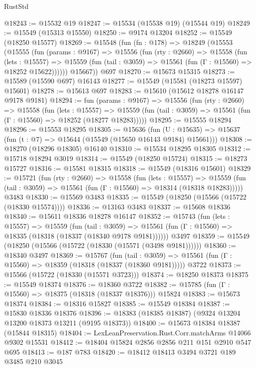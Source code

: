 \begin{lexlean}{RustStd}
\begin{coremodule}
@18243 := @15532 @19
@18247 := @15534 (@15538 @19) (@15544 @19)
@18249 := @15549 (@15313 @15550)
@18250 := @9174 @13204
@18252 := @15549 (@18250 @15577)
@18269 := @15548
    (fun (fn : @178) =>
    @18249
      (@15553
        (@15555
          (fun (params : @9167) =>
          @15556
            (fun (rty : @2660) =>
            @15558
              (fun (lets : @15557) =>
              @15559 (fun (tail : @3059) => @15561 (fun (Γ : @15560) => @18252 @15622))))))
        @15667))
    @697
@18270 := @15673 @15315
@18273 := @15589 (@15590 @697) @16143
@18277 := @15549 (@15581 (@18273 @15597) @15601)
@18278 := @15613 @697
@18283 := @15610 (@15612 @18278 @16147 @9178 @9181)
@18294 := fun (params : @9167) =>
  @15556
    (fun (rty : @2660) =>
    @15558
      (fun (lets : @15557) =>
      @15559 (fun (tail : @3059) => @15561 (fun (Γ : @15560) => @18252 (@18277 @18283)))))
@18295 := @15555 @18294
@18296 := @15553 @18295
@18305 := @15636
    (fun (U : @15635) => @15637 (fun (t : @7) => @15644 (@15549 (@15650 @16143 @9184) @15661)))
@18308 := @18270 (@18296 @18305) @16140
@18310 := @15534 @18295 @18305
@18312 := @15718 @18294 @3019
@18314 := @15549 (@18250 @15724)
@18315 := @18273 @15727
@18316 := @15581 @18315
@18318 := @15549 (@18316 @15601)
@18329 := @15721
    (fun (rty : @2660) =>
    @15558
      (fun (lets : @15557) =>
      @15559 (fun (tail : @3059) => @15561 (fun (Γ : @15560) => @18314 (@18318 @18283)))))
    @3483
@18330 := @15569 @3483
@18335 := @15549 (@18250 (@15566 (@15722 (@18330 @15574))))
@18336 := @13163 @3483
@18337 := @15608 @18336
@18340 := @15611 @18336 @18278 @16147
@18352 := @15743
    (fun (lets : @15557) =>
    @15559
      (fun (tail : @3059) =>
      @15561 (fun (Γ : @15560) => @18335 (@18318 (@18337 (@18340 @9178 @9181))))))
    @3497
@18359 := @15549 (@18250 (@15566 (@15722 (@18330 (@15571 (@3498 @9181))))))
@18360 := @18340 @3497
@18369 := @15767
    (fun (tail : @3059) => @15561 (fun (Γ : @15560) => @18359 (@18318 (@18337 (@18360 @9181)))))
    @3722
@18373 := @15566 (@15722 (@18330 (@15571 @3723)))
@18374 := @18250 @18373
@18375 := @15549 @18374
@18376 := @18360 @3722
@18382 := @15785 (fun (Γ : @15560) => @18375 (@18318 (@18337 @18376))) @15824
@18383 := @15673 @18374
@18384 := @18316 @15827
@18385 := @15549 @18384
@18387 := @15830 @18336 @18376
@18396 := @18383 (@18385 @18387) (@9324 @13204 @13200 @18373 @13211 (@9195 @18373))
@18400 := @15673 @18384 @18387 (@15844 @18315)
@18404 := LexLeanPreservation.Rust.Corr.matchArms @14066 @9302 @15531
@18412 := @18404 @15824 @2856 @2856 @211 @151 @2910 @547 @695
@18413 := @187 @783
@18420 := @18412 @18413 @3494 @3721 @189 @3485 @210 @3045

\end{coremodule}
\end{lexlean}
